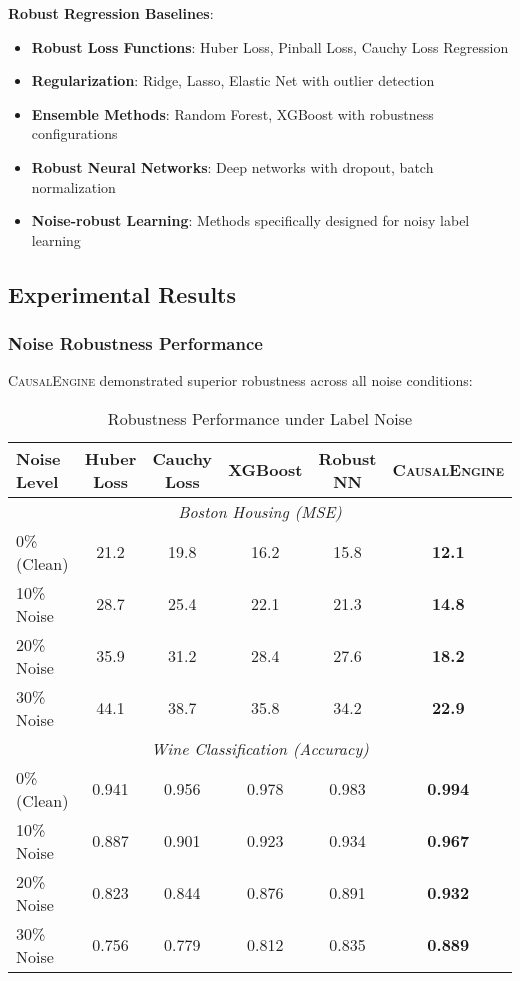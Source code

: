 \documentclass[conference]{IEEEtran}
\newcommand{\causalengine}{\textsc{CausalEngine}}
\begin{document}
\textbf{Robust Regression Baselines}:
\begin{itemize}
\item \textbf{Robust Loss Functions}: Huber Loss, Pinball Loss, Cauchy Loss Regression
\item \textbf{Regularization}: Ridge, Lasso, Elastic Net with outlier detection
\item \textbf{Ensemble Methods}: Random Forest, XGBoost with robustness configurations
\item \textbf{Robust Neural Networks}: Deep networks with dropout, batch normalization
\item \textbf{Noise-robust Learning}: Methods specifically designed for noisy label learning
\end{itemize}

\subsection{Experimental Results}

\subsubsection{Noise Robustness Performance}

\causalengine{} demonstrated superior robustness across all noise conditions:

\begin{table}[ht]
\centering
\caption{Robustness Performance under Label Noise}
\label{tab:noise_robustness}
\begin{tabular}{@{}lccccc@{}}
\toprule
\textbf{Noise Level} & \textbf{Huber Loss} & \textbf{Cauchy Loss} & \textbf{XGBoost} & \textbf{Robust NN} & \textbf{\causalengine{}} \\
\midrule
\multicolumn{6}{c}{\textit{Boston Housing (MSE)}} \\
0\% (Clean) & 21.2 & 19.8 & 16.2 & 15.8 & \textbf{12.1} \\
10\% Noise & 28.7 & 25.4 & 22.1 & 21.3 & \textbf{14.8} \\
20\% Noise & 35.9 & 31.2 & 28.4 & 27.6 & \textbf{18.2} \\
30\% Noise & 44.1 & 38.7 & 35.8 & 34.2 & \textbf{22.9} \\
\midrule
\multicolumn{6}{c}{\textit{Wine Classification (Accuracy)}} \\
0\% (Clean) & 0.941 & 0.956 & 0.978 & 0.983 & \textbf{0.994} \\
10\% Noise & 0.887 & 0.901 & 0.923 & 0.934 & \textbf{0.967} \\
20\% Noise & 0.823 & 0.844 & 0.876 & 0.891 & \textbf{0.932} \\
30\% Noise & 0.756 & 0.779 & 0.812 & 0.835 & \textbf{0.889} \\
\bottomrule
\end{tabular}
\end{table}
\end{document}
